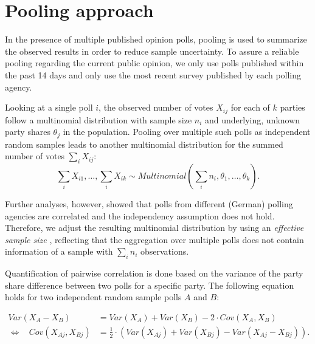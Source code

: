 \documentclass[smallcondensed]{svjour3}     %
\begin{document}
\section{Pooling approach} \label{sec:pooling}
In the presence of multiple published opinion polls, pooling is used to
summarize the observed results in order to reduce sample uncertainty.
To assure a reliable pooling regarding the current public opinion,
we only use polls published within the past 14 days and only use the
most recent survey published by each polling agency.

Looking at a single poll $i$, the observed number of votes $X_{ij}$ for each of $k$ parties follow a multinomial distribution with sample size $n_i$ and underlying, unknown party shares $\theta_j$ in the population.
Pooling over multiple such polls as independent random samples leads to another multinomial distribution for the summed number of votes $\sum_i X_{ij}$:
\begin{equation}
\sum\limits_i X_{i1},\ldots, \sum\limits_i X_{ik} \sim Multinomial \left( \sum\limits_i n_i,\theta_1,\ldots,\theta_k \right).
\end{equation}

Further analyses, however, showed that polls from different (German)
polling agencies are correlated
and the independency assumption does not hold.
Therefore, we adjust the resulting multinomial
distribution by using an \textit{effective sample size} \citep{hanley_2003},
reflecting that the aggregation over multiple polls does not contain
information of a sample with $\sum_i n_i$ observations.

Quantification of pairwise correlation is done based on the variance of the
party share difference between two polls for a specific party.
The following equation holds for two independent
random sample polls $A$ and $B$:

\begin{equation}
\begin{aligned}
Var(X_A - X_B) &= Var(X_A) + Var(X_B) - 2 \cdot Cov(X_A, X_B) \\
\Leftrightarrow \ \ \ \ Cov(X_{Aj}, X_{Bj}) &= \frac{1}{2} \cdot \left(Var(X_{Aj}) + Var(X_{Bj}) - Var(X_{Aj} - X_{Bj}) \right).
\end{aligned}
\end{equation}
\end{document}
